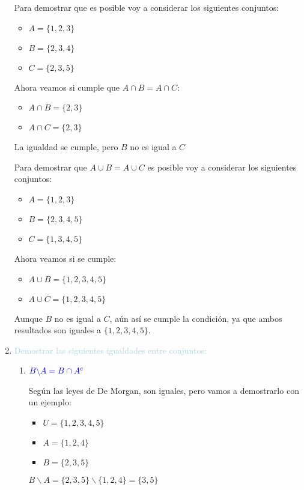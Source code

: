 \documentclass[12pt]{article}
\newcommand{\lb}[1]{\textcolor{lightblue}{#1}}
\newcommand{\db}[1]{\textcolor{blue}{#1}}
\begin{document}
\begin{enumerate}[label=\color{red}\textbf{\arabic*)},leftmargin=*]
      Para demostrar que es posible voy a considerar los siguientes conjuntos:
      \begin{itemize}[label=$-$]
      \item $A=\{1,2,3\}$
      \item $B=\{2,3,4\}$
      \item $C=\{2,3,5\}$
      \end{itemize}
      Ahora veamos si cumple que $A\cap B=A\cap C:$
      \begin{itemize}[label=$-$]
      \item $A\cap B=\{2,3\}$
      \item $A\cap C=\{2,3\}$
      \end{itemize}
      La igualdad se cumple, pero $B$ no es igual a $C$
      
      Para demostrar que $A\cup B=A\cup C$ es posible voy a considerar los siguientes conjuntos:
      
      \begin{itemize}[label=$-$]
            \item $A=\{1,2,3\}$
            \item $B=\{2,3,4,5\}$
            \item $C=\{1,3,4,5\}$
            \end{itemize}
            Ahora veamos si se cumple:
      \begin{itemize}[label=$-$]
            \item $A\cup B=\{1,2,3,4,5\}$
            \item $A\cup C=\{1,2,3,4,5\}$
            \end{itemize}
       Aunque $B$ no es igual a $C$, aún así se cumple la condición, ya que ambos resultados son iguales a $\{1,2,3,4,5\}$.
      \item \lb{Demostrar las siguientes igualdades entre conjuntos:}
      \begin{enumerate}[label=\color{red}\alph*)]
      	\item $\db{B\backslash A=B\cap A^c}$
      	
      	Según las leyes de De Morgan, son iguales, pero vamos a demostrarlo con un ejemplo:
      	\begin{itemize}[label=$-$]
      	\item $U=\{1,2,3,4,5\}$
      	\item $A=\{1,2,4\}$
      	\item $B=\{2,3,5\}$
      	\end{itemize}
      	$B\backslash A=\{2,3,5\}\backslash\{1,2,4\}=\{3,5\}$
      	

\end{enumerate}
\end{enumerate}
\end{document}
